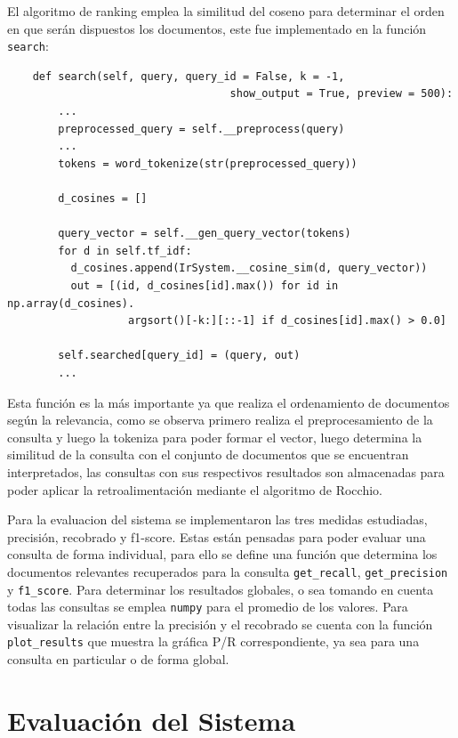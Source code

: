 \documentclass[runningheads,a4paper]{llncs}
\begin{document}
El algoritmo de ranking emplea la similitud del coseno para determinar el orden en que serán dispuestos los documentos, este fue implementado en la función \verb*|search|:

\noindent
%
\begin{verbatim}
	def search(self, query, query_id = False, k = -1, 
	                               show_output = True, preview = 500):
	    ...
	    preprocessed_query = self.__preprocess(query)
	    ...    
	    tokens = word_tokenize(str(preprocessed_query))
	    
	    d_cosines = []
	    	    
	    query_vector = self.__gen_query_vector(tokens)	    
	    for d in self.tf_idf:
	      d_cosines.append(IrSystem.__cosine_sim(d, query_vector))	    
	      out = [(id, d_cosines[id].max()) for id in np.array(d_cosines).
	               argsort()[-k:][::-1] if d_cosines[id].max() > 0.0]	    
	    
	    self.searched[query_id] = (query, out)
	    ...
\end{verbatim}
%
\noindent

Esta función es la más importante ya que realiza el ordenamiento de documentos según la relevancia, como se observa primero realiza el preprocesamiento de la consulta y luego la tokeniza para poder formar el vector, luego determina la similitud de la consulta con el conjunto de documentos que se encuentran interpretados, las consultas con sus respectivos resultados son almacenadas para poder aplicar la retroalimentación mediante el algoritmo de Rocchio.


Para la evaluacion del sistema se implementaron las tres medidas estudiadas, precisión, recobrado y f1-score. Estas están pensadas para poder evaluar una consulta de forma individual, para ello se define una función que determina los documentos relevantes recuperados para la consulta \verb*|get_recall|, \verb*|get_precision| y \verb*|f1_score|. Para determinar los resultados globales, o sea tomando en cuenta todas las consultas se emplea \verb*|numpy| para el promedio de los valores. Para visualizar la relación entre la precisión y el recobrado se cuenta con la función \verb*|plot_results| que muestra la gráfica P/R correspondiente, ya sea para una consulta en particular o de forma global.  

\section{Evaluación del Sistema}
\end{document}
